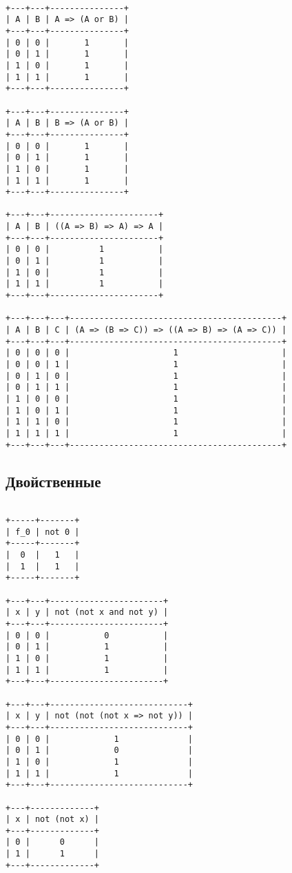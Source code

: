 \documentclass{article}
\begin{document}
\newpage

\begin{verbatim}

+---+---+---------------+
| A | B | A => (A or B) |
+---+---+---------------+
| 0 | 0 |       1       |
| 0 | 1 |       1       |
| 1 | 0 |       1       |
| 1 | 1 |       1       |
+---+---+---------------+

+---+---+---------------+
| A | B | B => (A or B) |
+---+---+---------------+
| 0 | 0 |       1       |
| 0 | 1 |       1       |
| 1 | 0 |       1       |
| 1 | 1 |       1       |
+---+---+---------------+

+---+---+----------------------+
| A | B | ((A => B) => A) => A |
+---+---+----------------------+
| 0 | 0 |          1           |
| 0 | 1 |          1           |
| 1 | 0 |          1           |
| 1 | 1 |          1           |
+---+---+----------------------+

+---+---+---+-------------------------------------------+
| A | B | C | (A => (B => C)) => ((A => B) => (A => C)) |
+---+---+---+-------------------------------------------+
| 0 | 0 | 0 |                     1                     |
| 0 | 0 | 1 |                     1                     |
| 0 | 1 | 0 |                     1                     |
| 0 | 1 | 1 |                     1                     |
| 1 | 0 | 0 |                     1                     |
| 1 | 0 | 1 |                     1                     |
| 1 | 1 | 0 |                     1                     |
| 1 | 1 | 1 |                     1                     |
+---+---+---+-------------------------------------------+

\end{verbatim}	

\newpage

\begin{center}
	\subsection*{Двойственные}
\end{center}

\begin{verbatim}

+-----+-------+
| f_0 | not 0 |
+-----+-------+
|  0  |   1   |
|  1  |   1   |
+-----+-------+

+---+---+-----------------------+
| x | y | not (not x and not y) |
+---+---+-----------------------+
| 0 | 0 |           0           |
| 0 | 1 |           1           |
| 1 | 0 |           1           |
| 1 | 1 |           1           |
+---+---+-----------------------+

+---+---+----------------------------+
| x | y | not (not (not x => not y)) |
+---+---+----------------------------+
| 0 | 0 |             1              |
| 0 | 1 |             0              |
| 1 | 0 |             1              |
| 1 | 1 |             1              |
+---+---+----------------------------+

+---+-------------+
| x | not (not x) |
+---+-------------+
| 0 |      0      |
| 1 |      1      |
+---+-------------+

\end{verbatim}
\end{document}

